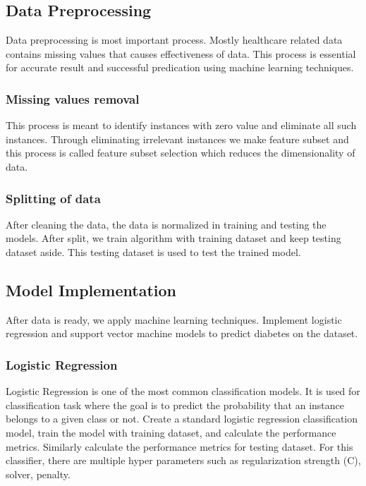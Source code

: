 \subsection{Data Preprocessing}
\label{sec:intro_some_sub2}
Data preprocessing is most important process. Mostly healthcare related data contains missing values that causes effectiveness of data. This process is essential for accurate result and successful predication using machine learning techniques.

\subsubsection{Missing values removal}
\label{sec:intro_some_subsub1}
This process is meant to identify instances with zero value and eliminate all such instances. Through eliminating irrelevant instances we make feature subset and this process is called feature subset selection which reduces the dimensionality of data.

\subsubsection{Splitting of data}
\label{sec:intro_some_subsub2}
After cleaning the data, the data is normalized in training and testing the models. After split, we train algorithm with training dataset and keep testing dataset aside. This testing dataset is used to test the trained model.

\subsection{Model Implementation}
\label{sec:intro_some_sub3}
After data is ready, we apply machine learning techniques. Implement logistic regression and support vector machine models to predict diabetes on the dataset.
\subsubsection{Logistic Regression}
Logistic Regression is one of the most common classification models. It is used for classification task where the goal is to predict the probability that an instance belongs to a given class or not. Create a standard logistic regression classification model, train the model with training dataset, and calculate the performance metrics. Similarly calculate the performance metrics for testing dataset. For this classifier, there are multiple hyper parameters such as regularization strength (C), solver, penalty.
